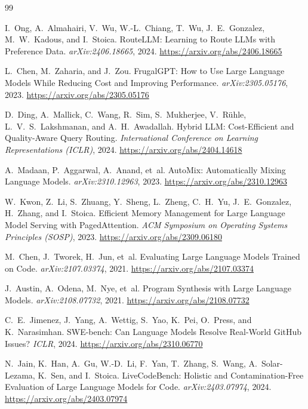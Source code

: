 \documentclass[11pt]{article}
\begin{document}
\begin{thebibliography}{99}
\small

I.~Ong, A.~Almahairi, V.~Wu, W.-L.~Chiang, T.~Wu, J.~E.~Gonzalez,
M.~W.~Kadous, and I.~Stoica.
\newblock RouteLLM: Learning to Route LLMs with Preference Data.
\newblock \emph{arXiv:2406.18665}, 2024. \url{https://arxiv.org/abs/2406.18665}

L.~Chen, M.~Zaharia, and J.~Zou.
\newblock FrugalGPT: How to Use Large Language Models While Reducing Cost and
Improving Performance.
\newblock \emph{arXiv:2305.05176}, 2023. \url{https://arxiv.org/abs/2305.05176}

D.~Ding, A.~Mallick, C.~Wang, R.~Sim, S.~Mukherjee, V.~R\"uhle,
L.~V.~S.~Lakshmanan, and A.~H.~Awadallah.
\newblock Hybrid LLM: Cost-Efficient and Quality-Aware Query Routing.
\newblock \emph{International Conference on Learning Representations (ICLR)},
2024. \url{https://arxiv.org/abs/2404.14618}

A.~Madaan, P.~Aggarwal, A.~Anand, et~al.
\newblock AutoMix: Automatically Mixing Language Models.
\newblock \emph{arXiv:2310.12963}, 2023. \url{https://arxiv.org/abs/2310.12963}

W.~Kwon, Z.~Li, S.~Zhuang, Y.~Sheng, L.~Zheng, C.~H.~Yu, J.~E.~Gonzalez,
H.~Zhang, and I.~Stoica.
\newblock Efficient Memory Management for Large Language Model Serving with
PagedAttention.
\newblock \emph{ACM Symposium on Operating Systems Principles (SOSP)}, 2023.
\url{https://arxiv.org/abs/2309.06180}

M.~Chen, J.~Tworek, H.~Jun, et~al.
\newblock Evaluating Large Language Models Trained on Code.
\newblock \emph{arXiv:2107.03374}, 2021. \url{https://arxiv.org/abs/2107.03374}

J.~Austin, A.~Odena, M.~Nye, et~al.
\newblock Program Synthesis with Large Language Models.
\newblock \emph{arXiv:2108.07732}, 2021. \url{https://arxiv.org/abs/2108.07732}

C.~E.~Jimenez, J.~Yang, A.~Wettig, S.~Yao, K.~Pei, O.~Press, and K.~Narasimhan.
\newblock SWE-bench: Can Language Models Resolve Real-World GitHub Issues?
\newblock \emph{ICLR}, 2024. \url{https://arxiv.org/abs/2310.06770}

N.~Jain, K.~Han, A.~Gu, W.-D.~Li, F.~Yan, T.~Zhang, S.~Wang, A.~Solar-Lezama,
K.~Sen, and I.~Stoica.
\newblock LiveCodeBench: Holistic and Contamination-Free Evaluation of Large
Language Models for Code.
\newblock \emph{arXiv:2403.07974}, 2024. \url{https://arxiv.org/abs/2403.07974}


\end{thebibliography}
\end{document}
